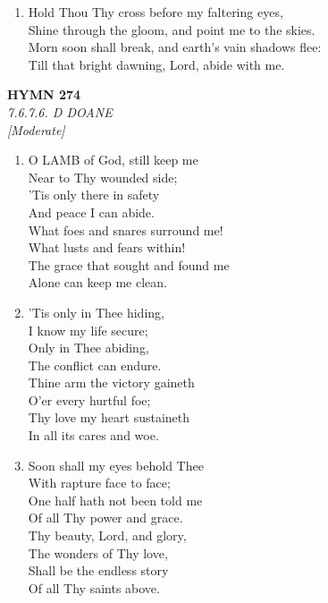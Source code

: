 \documentclass[11pt,a4paper]{article}
\begin{document}
\begin{enumerate}
    \item Hold Thou Thy cross before my faltering eyes, \\
        Shine through the gloom, and point me to the skies. \\
        Morn soon shall break, and earth's vain shadows flee: \\
        Till that bright dawning, Lord, abide with me.

\end{enumerate}

\newpage
\begin{center}
    {\Large \textbf{HYMN 274}}
    \\
    \textit{7.6.7.6. D DOANE}
    \\
    \textit{\small [Moderate]}
\end{center}
\vspace{1em}

\begin{enumerate}
    \item O LAMB of God, still keep me \\
        Near to Thy wounded side; \\
        'Tis only there in safety \\
        And peace I can abide. \\
        What foes and snares surround me! \\
        What lusts and fears within! \\
        The grace that sought and found me \\
        Alone can keep me clean.

    \item 'Tis only in Thee hiding, \\
        I know my life secure; \\
        Only in Thee abiding, \\
        The conflict can endure. \\
        Thine arm the victory gaineth \\
        O'er every hurtful foe; \\
        Thy love my heart sustaineth \\
        In all its cares and woe.

    \item Soon shall my eyes behold Thee \\
        With rapture face to face; \\
        One half hath not been told me \\
        Of all Thy power and grace. \\
        Thy beauty, Lord, and glory, \\
        The wonders of Thy love, \\
        Shall be the endless story \\
        Of all Thy saints above.

\end{enumerate}
\end{document}
